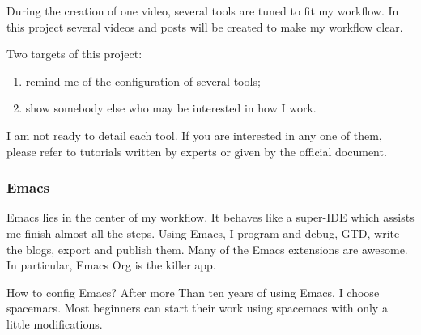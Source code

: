 \documentclass[koma,a4paper,captions=tableheading,11pt,listings-sv,microtype,paralist,colorlinks=true,urlcolor=blue,palatino]{org-article}
\begin{document}
During the creation of one video, several tools are tuned to fit my workflow. In
this project several videos and posts will be created to make my workflow clear.

Two targets of this project:
\begin{enumerate}
\item remind me of the configuration of several tools;
\item show somebody else who may be interested in how I work.
\end{enumerate}

I am not ready to detail each tool. If you are interested in any one of them,
please refer to tutorials written by experts or given by the official document.

\subsubsection{Emacs}
\label{sec:org2fbd9b9}


Emacs lies in the center of my workflow. It behaves like a super-IDE which
assists me finish almost all the steps. Using Emacs, I program and debug, GTD,
write the blogs, export and publish them. Many of the Emacs extensions are
awesome. In particular, Emacs Org is the killer app.

How to config Emacs? After more Than ten years of using Emacs, I choose
spacemacs. Most beginners can start their work using spacemacs with only a
little modifications.
\end{document}
